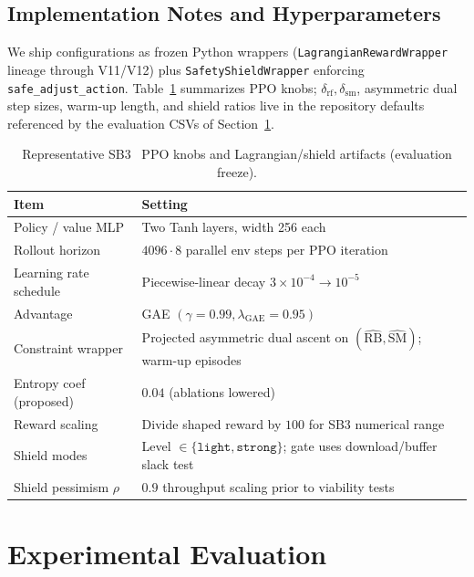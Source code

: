 \documentclass[preprint,12pt]{elsarticle}
\begin{document}
\subsection{Implementation Notes and Hyperparameters}

We ship configurations as frozen Python wrappers (\texttt{LagrangianRewardWrapper} lineage through V11/V12) plus \texttt{SafetyShieldWrapper} enforcing \texttt{safe\_adjust\_action}. Table~\ref{tab:hypers} summarizes PPO knobs; \(\delta_{\mathrm{rf}},\delta_{\mathrm{sm}}\), asymmetric dual step sizes, warm-up length, and shield ratios live in the repository defaults referenced by the evaluation CSVs of Section~\ref{sec:eval}.

\begin{table}[t]
    \caption{Representative SB3~\cite{raffin2021sb3} PPO knobs and Lagrangian/shield artifacts (evaluation freeze).}
    \label{tab:hypers}
    \centering
    \small
    \begin{tabular}{@{}ll@{}}
    \toprule
    Item & Setting \\ \midrule
    Policy / value MLP & Two Tanh layers, width 256 each~\cite{schulman2017proximal}\\
    Rollout horizon & \(4096\cdot 8\) parallel env steps per PPO iteration\\
    Learning rate schedule & Piecewise-linear decay \(3{\times}10^{-4}{\rightarrow}10^{-5}\)\\
    Advantage & GAE \((\gamma{=}0.99,\lambda_{\mathrm{GAE}}{=}0.95)\) \\
    Constraint wrapper & Projected asymmetric dual ascent on \((\hat{\mathrm{RB}},\hat{\mathrm{SM}})\); warm-up episodes \\
    Entropy coef (proposed) & \(0.04\) (ablations lowered)\\
    Reward scaling & Divide shaped reward by \(100\) for SB3 numerical range\\
    Shield modes & Level \(\in\{\texttt{light},\texttt{strong}\}\); gate uses download/buffer slack test\\
    Shield pessimism \(\rho\) & \(0.9\) throughput scaling prior to viability tests\\\bottomrule
    \end{tabular}
\end{table}

\section{Experimental Evaluation}
\label{sec:eval}
\end{document}
